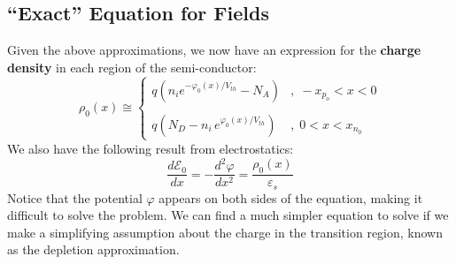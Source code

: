 \subsection{“Exact” Equation for Fields}
Given the above approximations, we now have an expression for the \textbf{charge density} in each region of the semi-conductor:
    \begin{equation}
        \rho _0(x) \cong
            \begin{cases} 
                q(n_i{e^{-\varphi_0(x)/V_{th}}} - {N_A}) &,\; -x_{p_o} < x < 0 \\ \\
                q(N_D - n_i\,{e^{\varphi_0(x)/V_{th}}}) &,\; 0 < x < x_{n_0}
            \end{cases}
    \end{equation}
We also have the following result from electrostatics:
    \begin{equation} 
        \frac{d{\mathcal{E}_0}}{dx} = -\frac{d^2\varphi}{dx^2} = \frac{\rho_0(x)}{\varepsilon_s}
    \end{equation}
Notice that the potential $\varphi$ appears on both sides of the equation, making it difficult to solve the problem.   We can find a much simpler equation to solve if we make a simplifying assumption about the charge in the transition region, known as the depletion approximation.

